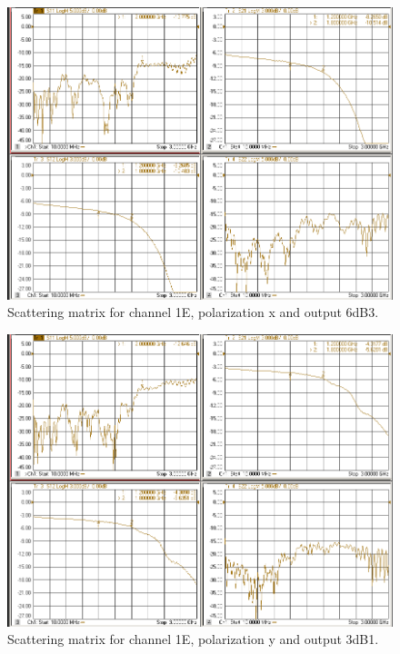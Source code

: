 \documentclass[12pt,a4paper,oneside]{article}
\begin{document}
\begin{figure}[H]
\centering
\includegraphics[width=0.9\linewidth]{VNA_results/1Ex_6dB3.png}
\caption{Scattering matrix for channel 1E, polarization x and output 6dB3.}
\label{fig:1Ex_6dB3}
\end{figure}


\begin{figure}[H]
\centering
\includegraphics[width=0.9\linewidth]{VNA_results/1Ey_3dB1.png}
\caption{Scattering matrix for channel 1E, polarization y and output 3dB1.}
\label{fig:1Ey_3dB1}
\end{figure}
\end{document}
